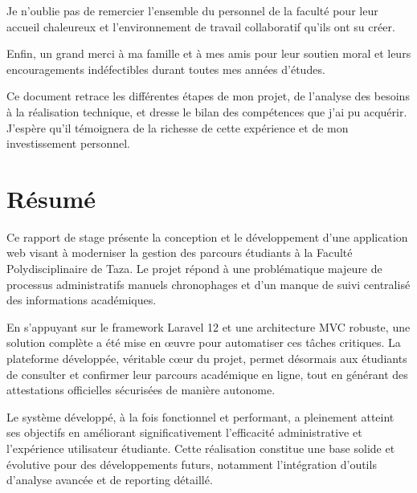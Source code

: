 \documentclass[12pt,a4paper]{report}
\begin{document}
Je n'oublie pas de remercier l'ensemble du personnel de la faculté pour leur accueil chaleureux et l'environnement de travail collaboratif qu'ils ont su créer.

Enfin, un grand merci à ma famille et à mes amis pour leur soutien moral et leurs encouragements indéfectibles durant toutes mes années d'études.

Ce document retrace les différentes étapes de mon projet, de l'analyse des besoins à la réalisation technique, et dresse le bilan des compétences que j'ai pu acquérir. J'espère qu'il témoignera de la richesse de cette expérience et de mon investissement personnel.


\newpage


\chapter*{Résumé}

Ce rapport de stage présente la conception et le développement d'une application web visant à moderniser la gestion des parcours étudiants à la Faculté Polydisciplinaire de Taza. Le projet répond à une problématique majeure de processus administratifs manuels chronophages et d'un manque de suivi centralisé des informations académiques. 

En s'appuyant sur le framework Laravel 12 et une architecture MVC robuste, une solution complète a été mise en œuvre pour automatiser ces tâches critiques. La plateforme développée, véritable cœur du projet, permet désormais aux étudiants de consulter et confirmer leur parcours académique en ligne, tout en générant des attestations officielles sécurisées de manière autonome.

Le système développé, à la fois fonctionnel et performant, a pleinement atteint ses objectifs en améliorant significativement l'efficacité administrative et l'expérience utilisateur étudiante. Cette réalisation constitue une base solide et évolutive pour des développements futurs, notamment l'intégration d'outils d'analyse avancée et de reporting détaillé.
\end{document}
